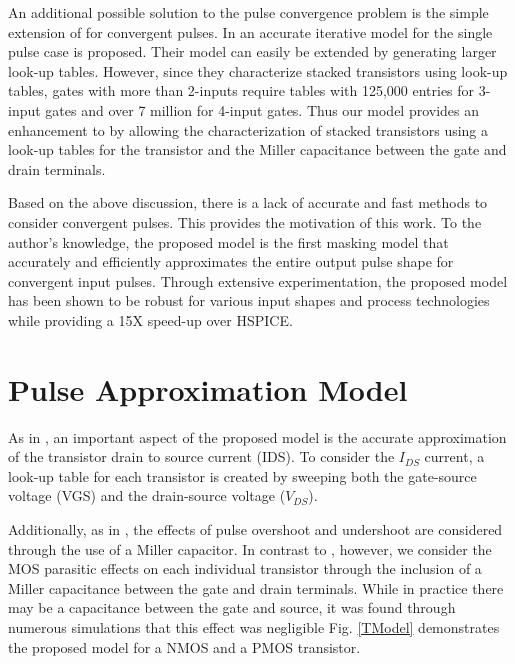 An additional possible solution to the pulse convergence problem is the simple extension of \cite{Accurate_Masking} for convergent pulses. In \cite{Accurate_Masking} an accurate iterative model for the single pulse case is proposed. Their model can easily be extended by generating larger look-up tables. However, since they characterize stacked transistors using look-up tables, gates with more than 2-inputs require tables with 125,000 entries for 3-input gates and over 7 million for 4-input gates. Thus our model provides an enhancement to \cite{Accurate_Masking} by allowing the characterization of stacked transistors using a look-up tables for the transistor and the Miller capacitance between the gate and drain terminals.

Based on the above discussion, there is a lack of accurate and fast methods to consider convergent pulses.  This provides the motivation of this work. To the author’s knowledge, the proposed model is the first masking model that accurately and efficiently approximates the entire output pulse shape for convergent input pulses. Through extensive experimentation, the proposed model has been shown to be robust for various input shapes and process technologies while providing a 15X speed-up over HSPICE.

\section{Pulse Approximation Model}
As in \cite{Accurate_Masking}, an important aspect of the proposed model is the accurate approximation of the transistor drain to source current (IDS). To consider the $I_{DS}$ current, a look-up table for each transistor is created by sweeping both the gate-source voltage (VGS) and the drain-source voltage ($V_{DS}$).
 
Additionally, as in \cite{Accurate_Masking}, the effects of pulse overshoot and undershoot are considered through the use of a Miller capacitor. In contrast to \cite{Accurate_Masking}, however, we consider the MOS parasitic effects on each individual transistor through the inclusion of a Miller capacitance between the gate and drain terminals. While in practice there may be a capacitance between the gate and source, it was found through numerous simulations that this effect was negligible Fig. \ref{TModel} demonstrates the proposed model for a NMOS and a PMOS transistor. 

